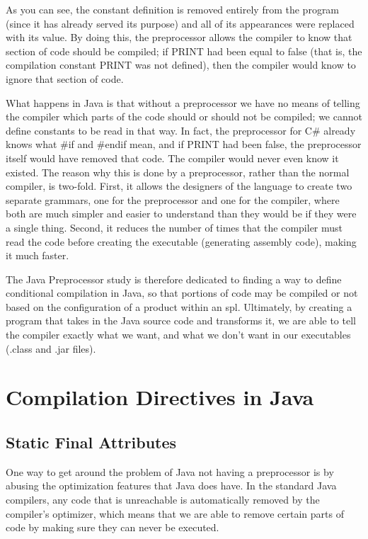 As you can see, the constant definition is removed entirely from the program (since it has already served its purpose) and all of its appearances were replaced with its value. By doing this, the preprocessor allows the compiler to know that section of code should be compiled; if PRINT had been equal to false (that is, the compilation constant PRINT was not defined), then the compiler would know to ignore that section of code.

What happens in Java is that without a preprocessor we have no means of telling the compiler which parts of the code should or should not be compiled; we cannot define constants to be read in that way. In fact, the preprocessor for C\# already knows what \#if and \#endif mean, and if PRINT had been false, the preprocessor itself would have removed that code. The compiler would never even know it existed. The reason why this is done by a preprocessor, rather than the normal compiler, is two-fold. First, it allows the designers of the language to create two separate \gls{grammar}s, one for the preprocessor and one for the compiler, where both are much simpler and easier to understand than they would be if they were a single thing. Second, it reduces the number of times that the compiler must read the code before creating the executable (generating assembly code), making it much faster.

The Java Preprocessor study is therefore dedicated to finding a way to define conditional compilation in Java, so that portions of code may be compiled or not based on the configuration of a product within an \acrshort{spl}. Ultimately, by creating a program that takes in the Java source code and transforms it, we are able to tell the compiler exactly what we want, and what we don't want in our executables (.class and .jar files).


\section{Compilation Directives in Java}
\label{sc:compjava}


\subsection{Static Final Attributes}

One way to get around the problem of Java not having a preprocessor is by abusing the optimization features that Java does have. In the standard Java compilers, any code that is unreachable is automatically removed by the compiler's optimizer, which means that we are able to remove certain parts of code by making sure they can never be executed.

